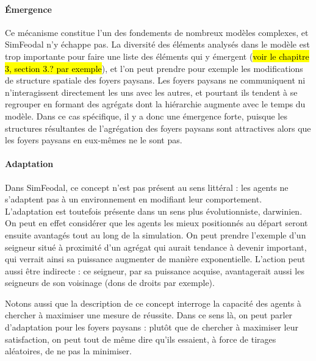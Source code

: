 \paragraph{Émergence} Ce mécanisme constitue l'un des fondements de nombreux modèles complexes, et SimFeodal n'y échappe pas.
La diversité des éléments analysés dans le modèle est trop importante pour faire une liste des éléments qui y émergent (\hl{voir le chapitre 3, section 3.? par exemple}), et l'on peut prendre pour exemple les modifications de structure spatiale des foyers paysans.
Les foyers paysans ne communiquent ni n'interagissent directement les uns avec les autres, et pourtant ils tendent à se regrouper en formant des agrégats dont la hiérarchie augmente avec le temps du modèle.
Dans ce cas spécifique, il y a donc une émergence \og forte\fg{}, puisque les structures résultantes de l'agrégation des foyers paysans sont attractives alors que les foyers paysans en eux-mêmes ne le sont pas.

\paragraph{Adaptation} Dans SimFeodal, ce concept n'est pas présent au sens littéral : les agents ne s'adaptent pas à un environnement en modifiant leur comportement.
L'adaptation est toutefois présente dans un sens plus évolutionniste, darwinien.
On peut en effet considérer que les agents les mieux positionnés au départ seront ensuite avantagés tout au long de la simulation.
On peut prendre l'exemple d'un seigneur situé à proximité d'un agrégat qui aurait tendance à devenir important, qui verrait ainsi sa puissance augmenter de manière exponentielle.
L'action peut aussi être indirecte : ce seigneur, par sa puissance acquise, avantagerait aussi les seigneurs de son voisinage (dons de droits par exemple).

Notons aussi que la description de ce concept interroge la capacité des agents à chercher à maximiser une mesure de réussite.
Dans ce sens là, on peut parler d'adaptation pour les foyers paysans : plutôt que de chercher à maximiser leur satisfaction, on peut tout de même dire qu'ils essaient, à force de tirages aléatoires, de ne pas la minimiser.


